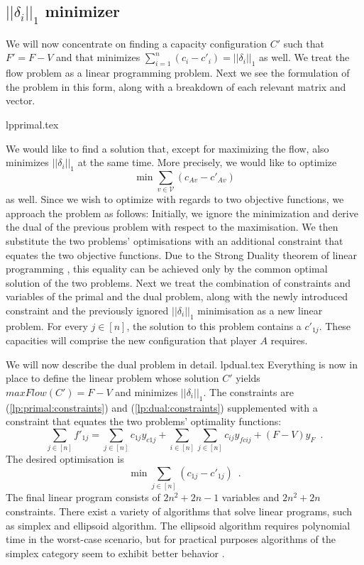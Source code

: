 \subsection{$||\delta_i||_1$ minimizer} \label{d1minimizer}
  We will now concentrate on finding a capacity configuration $C'$ such that $F' = F - V$ and that minimizes
  $\sum\limits_{i=1}^{n}\left(c_i-c'_i\right) = ||\delta_i||_1$ as well. We treat the flow problem as a linear programming
  problem. Next we see the formulation of the problem in this form, along with a breakdown of each relevant matrix and
  vector.

  {lpprimal.tex}

  We would like to find a solution that, except for maximizing the flow, also minimizes $||\delta_i||_1$ at the same time.
  More precisely, we would like to optimize
  \begin{equation*}
    \min{\sum\limits_{v \in \mathcal{V}}\left(c_{Av} - c'_{Av}\right)}
  \end{equation*}
  as well. Since we wish to optimize with regards to two objective functions, we approach the problem as follows: Initially,
  we ignore the minimization and derive the dual of the previous problem with respect to the maximisation. We then substitute
  the two problems' optimisations with an additional constraint that equates the two objective functions. Due to the Strong
  Duality theorem of linear programming \cite{amo}, this equality can be achieved only by the common optimal solution of the
  two problems. Next we treat the combination of constraints and variables of the primal and the dual problem, along with the
  newly introduced constraint and the previously ignored $||\delta_i||_1$ minimisation as a new linear problem. For every $j
  \in \left[n\right]$, the solution to this problem contains a $c'_{1j}$. These capacities will comprise the new configuration
  that player $A$ requires.

  We will now describe the dual problem in detail.
  {lpdual.tex}
  Everything is now in place to define the linear problem whose solution $C'$ yields $maxFlow\left(C'\right) = F - V$ and
  minimizes $||\delta_i||_1$. The constraints are (\ref{lp:primal:constraints}) and (\ref{lp:dual:constraints}) supplemented
  with a constraint that equates the two problems' optimality functions:
  \begin{equation*}
    \sum\limits_{j \in \left[n\right]}f'_{1j} = \sum\limits_{j \in \left[n\right]}c_{1j}y_{c1j} +
    \sum\limits_{i \in \left[n\right]}\sum\limits_{j \in \left[n\right]}c_{ij}y_{fcij} + \left(F - V\right)y_F \enspace.
  \end{equation*}
  The desired optimisation is
  \begin{equation*}
    \min{\sum\limits_{j \in \left[n\right]}\left(c_{1j} - c'_{1j}\right)} \enspace.
  \end{equation*}
  The final linear program consists of $2n^2 + 2n - 1$ variables and $2n^2 + 2n$ constraints. There exist a variety of
  algorithms that solve linear programs, such as simplex and ellipsoid algorithm. The ellipsoid algorithm requires polynomial
  time in the worst-case scenario, but for practical purposes algorithms of the simplex category seem to exhibit better
  behavior \cite{it}.
